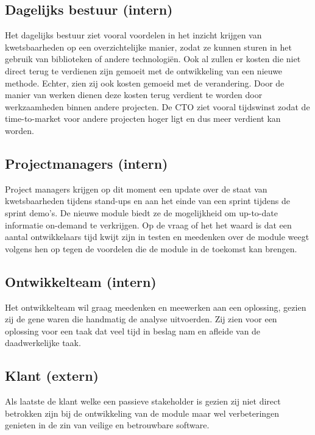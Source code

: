 \subsection{Dagelijks bestuur (intern)}\label{subsec:dagelijks-bestuur-(intern)1}
Het dagelijks bestuur ziet vooral voordelen in het inzicht krijgen van kwetsbaarheden op een overzichtelijke manier, zodat ze kunnen sturen in het gebruik van biblioteken of andere technologiën. Ook al zullen er kosten die niet direct terug te verdienen zijn gemoeit met de ontwikkeling van een nieuwe methode.
Echter, zien zij ook kosten gemoeid met de verandering.
Door de manier van werken dienen deze kosten terug verdient te worden door werkzaamheden binnen andere projecten.
De CTO ziet vooral tijdswinst zodat de time-to-market voor andere projecten hoger ligt en dus meer verdient kan worden.

\subsection{Projectmanagers (intern)}\label{subsec:projectmanagers-(intern)1}
Project managers krijgen op dit moment een update over de staat van kwetsbaarheden tijdens stand-ups en aan het einde van een sprint tijdens de sprint demo's.
De nieuwe module biedt ze de mogelijkheid om up-to-date informatie on-demand te verkrijgen.
Op de vraag of het het waard is dat een aantal ontwikkelaars tijd kwijt zijn in testen en meedenken over de module weegt volgens hen op tegen de voordelen die de module in de toekomst kan brengen.

\subsection{Ontwikkelteam (intern)}\label{subsec:ontwikkelteam-(intern)1}
Het ontwikkelteam wil graag meedenken en meewerken aan een oplossing, gezien zij de gene waren die handmatig de analyse uitvoerden.
Zij zien voor een oplossing voor een taak dat veel tijd in beslag nam en afleide van de daadwerkelijke taak.

\subsection{Klant (extern)}\label{subsec:klant-(extern)1}
Als laatste de klant welke een passieve stakeholder is gezien zij niet direct betrokken zijn bij de ontwikkeling van de module maar wel verbeteringen genieten in de zin van veilige en betrouwbare software.

